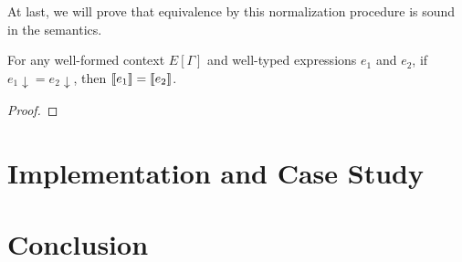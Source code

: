 \documentclass[runningheads]{llncs}
\begin{document}
At last, we will prove that equivalence by this normalization procedure is sound in the semantics. 

\begin{theorem}[soundness]
    For any well-formed context $E[\Gamma]$ and well-typed expressions $e_1$ and $e_2$, if $e_1\downarrow = e_2\downarrow$, then ${\llbracket e_1 \rrbracket} = {\llbracket e_2 \rrbracket}$.
\end{theorem}
\begin{proof}
    
\end{proof}




\section{Implementation and Case Study}



\section{Conclusion}

\clearpage

\end{document}
